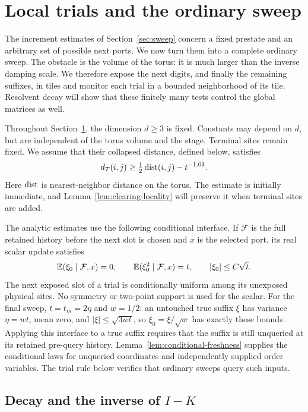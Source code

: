 \section{Local trials and the ordinary sweep}\label{sec:local-sweeps}

The increment estimates of Section~\ref{sec:sweep} concern a fixed
prestate and an arbitrary set of possible next ports.  We now turn them
into a complete ordinary sweep.  The obstacle is the volume of the torus:
it is much larger than the inverse damping scale.  We therefore expose
the next digits, and finally the remaining suffixes, in tiles and monitor each trial in a bounded
neighborhood of its tile.  Resolvent decay will show that these finitely
many tests control the global matrices as well.

Throughout Section~\ref{sec:local-sweeps}, the dimension \(d\ge3\) is fixed.  Constants
may depend on \(d\), but are independent of the torus volume and the
stage.  Terminal sites remain fixed.  We assume that
their collapsed distance, defined below, satisfies
\begin{equation}\label{eq:local-metric-input}
 d_T(i,j)\ge\tfrac12\operatorname{dist}(i,j)-t^{-1.03}.
\end{equation}
Here \(\operatorname{dist}\) is nearest-neighbor distance on the torus.  The estimate is
initially immediate, and Lemma~\ref{lem:clearing-locality} will preserve it
when terminal sites are added.

The analytic estimates use the following conditional interface.  If
\(\mathcal F\) is the full retained history before the next slot is
chosen and \(x\) is the selected port, its real scalar update satisfies
\[
 \mathbb E(\xi_0\mid\mathcal F,x)=0,\qquad
 \mathbb E(\xi_0^2\mid\mathcal F,x)=t,\qquad
 |\xi_0|\le C\sqrt t.
\]
The next exposed slot of a trial is conditionally uniform among its
unexposed physical sites.  No symmetry or two-point support is used for
the scalar.  For the final sweep,
\(t=t_m=2\eta\) and \(w=1/2\): an untouched true suffix \(\xi\)
has variance \(\eta=wt\), mean zero, and
\(|\xi|\le\sqrt{3wt}\), so \(\xi_0=\xi/\sqrt w\) has exactly
these bounds.  Applying this interface to a true suffix requires that
the suffix is still unqueried at its retained pre-query history.
Lemma~\ref{lem:conditional-freshness} supplies the conditional laws for
unqueried coordinates and independently supplied order variables.  The
trial rule below verifies that ordinary sweeps query such inputs.

\subsection{Decay and the inverse of \texorpdfstring{$I-K$}{I-K}}

